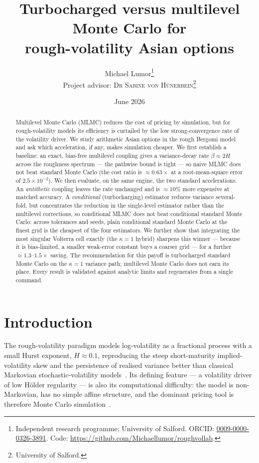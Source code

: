 \documentclass[11pt]{article}
\title{Turbocharged versus multilevel Monte Carlo for\\
rough-volatility Asian options}
\author{Michael Lumor\thanks{Independent research programme; University of
Salford. ORCID: \href{https://orcid.org/0009-0000-0326-3891}{0009-0000-0326-3891}.
Code: \url{https://github.com/Michaellumor/roughvollab}.}\\[0.4em]
\normalsize Project advisor: \textsc{Dr Sabine von H\"unerbein}\thanks{University of Salford.}}
\date{June 2026}
\newcommand{\costratio}{0.63}
\begin{document}
\maketitle

\begin{abstract}
Multilevel Monte Carlo (MLMC) reduces the cost of pricing by simulation, but for
rough-volatility models its efficiency is curtailed by the low strong-convergence rate
of the volatility driver. We study arithmetic Asian options in the rough Bergomi model
and ask which acceleration, if any, makes simulation cheaper. We first establish a
baseline: an exact, bias-free multilevel coupling gives a variance-decay rate
$\beta\approx2H$ across the roughness spectrum --- the pathwise bound is tight --- so
naive MLMC does not beat standard Monte Carlo (the cost ratio is $\approx\costratio\times$
at a root-mean-square error of $2.5\times10^{-2}$). We then evaluate, on the same
engine, the two standard accelerations. An \emph{antithetic} coupling leaves the rate
unchanged and is $\approx$10\% more expensive at matched accuracy. A \emph{conditional}
(turbocharging) estimator reduces variance several-fold, but concentrates the reduction
in the single-level estimator rather than the multilevel corrections, so conditional
MLMC does not beat conditional standard Monte Carlo: across tolerances and seeds, plain
conditional standard Monte Carlo at the finest grid is the cheapest of the four
estimators. We further show that integrating the most singular Volterra cell exactly
(the $\kappa=1$ hybrid) sharpens this winner --- because it is bias-limited, a smaller
weak-error constant buys a coarser grid --- for a further $\approx1.3$--$1.5\times$
saving. The recommendation for this payoff is turbocharged standard Monte Carlo on the
$\kappa=1$ variance path; multilevel Monte Carlo does not earn its place. Every result
is validated against analytic limits and regenerates from a single command.
\end{abstract}

\section{Introduction}

The rough-volatility paradigm models log-volatility as a fractional process with a
small Hurst exponent, $H\approx0.1$, reproducing the steep short-maturity
implied-volatility skew and the persistence of realised variance better than classical
Markovian stochastic-volatility models~\cite{gjr2018,bfg2016}. Its defining feature ---
a volatility driver of low H\"older regularity --- is also its computational difficulty:
the model is non-Markovian, has no simple affine structure, and the dominant pricing
tool is therefore Monte Carlo simulation~\cite{bfg2016,mccrickerd2018}.
\end{document}

